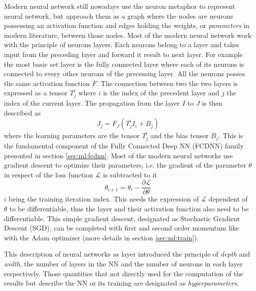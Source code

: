 \documentclass[../main.tex]{subfiles}
\begin{document}
Modern neural network still nowadays use the neuron metaphor to represent neural network, but approach them as a graph where the nodes are neurons possessing an activation function and edges holding the weights, or \textit{parameters} in modern literature, between those nodes. Most of the modern neural network work with the principle of neurons layers. Each neurons belong to a layer and takes input from the preceding layer and forward it result to next layer. For example the most basic set layer is the fully connected layer where each of its neurons is connected to every other neurons of the precessing layer. All the neurons posses the same activation function $F$. The connection between two the two layers is expressed as a tensor $T^{i}_{j}$ where $i$ is the index of the precedent layer and $j$ the index of the current layer. The propagation from the layer $I$ to $J$ is then described as
\begin{equation}
  \label{eq:ml:fully-connected}
  J_{j} = F_J(T_{j}^{i} I_{i} + B_j)
\end{equation}
where the learning parameters are the tensor $T_j^i$ and the bias tensor $B_j$. This is the fundamental component of the Fully Connected Deep NN (FCDNN) family presented in section \ref{sec:ml:fcdnn}. Most of the modern neural networks use gradient descent to optimize their parameters, i.e. the gradient of the parameter $\theta$ in respect of the loss function $\mathcal{L}$ is subtracted to it
\begin{equation}
  \theta_{i+1} = \theta_i - \frac{\partial \mathcal{L}}{\partial \theta}
\end{equation}
$i$ being the training iteration index. This needs the expression of $\mathcal{L}$ dependent of $\theta$ to be differentiable, thus the layer and their activation function also need to be differentiable. This simple gradient descent, designated as Stochastic Gradient Descent (SGD), can be completed with first and second order momentum like with the Adam optimizer \cite{kingma_adam_2017} (more details in section \ref{sec:ml:train}).

This description of neural networks as layer introduced the principle of \textit{depth} and \textit{width}, the number of layers in the NN and the number of neurons in each layer respectively. Those quantities that not directly used for the computation of the results but describe the NN or its training are designated as \textit{hyperparameters}.
\end{document}
